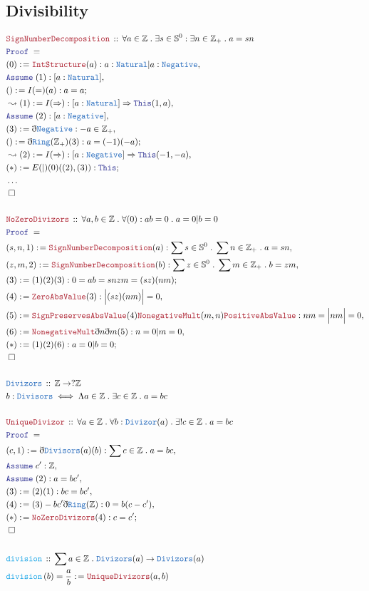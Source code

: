 \documentclass[12pt]{scrartcl}
\newcommand{\TYPE}[1]{\textcolor{NavyBlue}{\mathtt{#1}}}
\newcommand{\FUNC}[1]{\textcolor{Cerulean}{\mathtt{#1}}}
\newcommand{\LOGIC}[1]{\textcolor{Blue}{\mathtt{#1}}}
\newcommand{\THM}[1]{\textcolor{Maroon}{\mathtt{#1}}}
\renewcommand{\.}{\; . \;}
\newcommand{\de}{: \kern 0.1pc =}
\newcommand{\Act}[1]{\left( #1 \right)}
\newcommand{\Theorem}[2]{& \THM{#1} \, :: \, #2 \\ & \Proof = \\ }
\newcommand{\DeclareType}[2]{& \TYPE{#1} \, :: \, #2 \\}
\newcommand{\DefineType}[3]{& #1 : \TYPE{#2} \iff #3 \\}
\newcommand{\DeclareFunc}[2]{& \FUNC{#1} \, :: \, #2 \\}
\newcommand{\DefineNamedFunc}[4]{&  \FUNC{#1}\Act{#2} = #3 \de #4 \\}
\newcommand{\Page}[1]{ \begin{align*} #1 \end{align*}   }
\newcommand{ \bd }{ \ByDef }
\newcommand{\NoProof}{ & \ldots \\ \EndProof}
\newcommand{\Int}{\mathbb{Z} }
\newcommand{\Say}[3]{& #1 \de #2 : #3, \\}
\newcommand{\Conclude}[3]{& #1 \de #2 : #3; \\}
\newcommand{\Derive}[3]{& \leadsto #1 \de #2 : #3, \\}
\newcommand{\Assume}[2]{& \LOGIC{Assume} \; #1 : #2, \\}
\newcommand{\QED}{\; \square}
\newcommand{\EndProof}{& \QED \\}
\newcommand{\ByDef}{\eth}
\newcommand{\Proof}{\LOGIC{Proof} \; }
\begin{document}
\subsection{Divisibility}
\Page{
	\Theorem{SignNumberDecomposition}{\forall a \in \Int \. \exists s \in \mathbb{S}^0 : \exists n \in \Int_+ \. a = sn}
	\Say{(0)}{\THM{IntStructure}(a)}{a : \TYPE{Natural} | a : \TYPE{Negative}}
	\Assume{(1)}{[a : \TYPE{Natural}]}
	\Conclude{()}{I(=)(a)}{a = a}
	\Derive{(1)}{I(\Rightarrow)}{ [a : \TYPE{Natural}] \Rightarrow \LOGIC{This}(1,a)}
	\Assume{(2)}{[a : \TYPE{Negative}]}
	\Say{(3)}{\bd \TYPE{Negative}}{ - a \in \Int_+ }
	\Conclude{()}{\bd \TYPE{Ring}(\Int_+)(3)}{ a = (-1)(-a)  }
	\Derive{(2)}{I(\Rightarrow)}{[a : \TYPE{Negative}] \Rightarrow \LOGIC{This}(-1,-a)}
	\Conclude{(*)}{E(|)(0)((2),(3))}{\LOGIC{This}}
	\NoProof
	\\
	\Theorem{NoZeroDivizors}{\forall a, b \in \Int \. \forall (0) : ab = 0 \. a = 0 | b = 0}
	\Say{(s,n,1)}{\THM{SignNumberDecomposition}(a)}{ \sum s \in \mathbb{S}^0 \. \sum n \in \Int_{+} \. a = sn }
	\Say{(z,m,2)}{\THM{SignNumberDecomposition}(b)}{ \sum z \in \mathbb{S}^{0} \. \sum m \in \Int_{+} \. b = zm}
	\Conclude{(3)}{(1)(2)(3)}{0 = ab = snzm = (sz)(nm)}
	\Say{(4)}{\THM{ZeroAbsValue}(3)}{ \Big| (sz)(nm) \Big| = 0  }
	\Say{(5)}{\THM{SignPreservesAbsValue}(4)\THM{NonegativeMult}(m,n)\THM{PositiveAbsValue}}{ nm = \Big| nm  \Big| = 0}
	\Say{(6)}{\THM{NonegativeMult}\bd n \bd m(5)}{ n = 0 | m = 0}
	\Conclude{(*)}{(1)(2)(6)}{a = 0 | b = 0}
	\EndProof
	\\
	\DeclareType{Divizors}{\Int \to ?\Int}
	\DefineType{b}{Divisors}{\Lambda a \in \Int \. \exists c \in \Int \. a = bc}
	\\
	\Theorem{UniqueDivizor}{\forall a \in \Int  \. \forall b : \TYPE{Divizor}(a) \. \exists! c \in \Int \. a = bc }
	\Say{(c,1)}{\bd \TYPE{Divisors}(a)(b)}{\sum c \in \Int \. a = bc}
	\Assume{c'}{\Int}
	\Assume{(2)}{a = bc'}
	\Say{(3)}{(2)(1)}{bc = bc'}
	\Say{(4)}{(3) - bc' \bd \TYPE{Ring}(\Int)}{0 = b(c - c')}
	\Conclude{(*)}{\THM{NoZeroDivizors}(4)}{c = c' }
	\EndProof
	\\
	\DeclareFunc{division}{\sum a \in \Int \. \TYPE{Divizors}(a) \to \TYPE{Divizors}(a)}
	\DefineNamedFunc{division}{b}{\frac{a}{b}}{\THM{UniqueDivizors}(a,b)}
}
\end{document}
